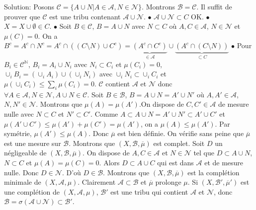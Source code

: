 \documentclass{report}
\begin{document}
Solution: Posons $\mathcal C = \{A\cup N| A\in \mathcal A, N\in \mathcal N\}$.  Montrons $\mathcal B = \mathcal C$.\newline
\fbox{$\subset$} Il suffit de prouver que $\mathcal C$ est une tribu contenant $\mathcal A \cup \mathcal N$. \newline
$\bullet$ $\mathcal A \cup \mathcal N \subset C$ \quad OK.\newline
$\bullet$ $X = X\cup \emptyset \in C$.\newline
$\bullet$ Soit $B\in \mathcal C$, $B= A\cup N$ avec $N\subset C$ où $A,C\in \mathcal A$, $N\in \mathcal N$ et $\mu(C)=0$.\newline
On a $B^c = A^c \cap N^c = A^c \cap ((C\setminus N) \cup C^c) = \underbrace{(A^c \cap C^c)}_{\in \mathcal A}\cup \underbrace{(A^c \cap (C\setminus N))}_{\subset C}$\newline
$\bullet$ Pour $B_i\in \mathcal C^{\mathbb N}$, $B_i = A_i \cup N_i$ avec $N_i\subset C_i$ et $\mu(C_i)=0$, \newline
$\cup_i B_i = (\cup_i A_i) \cup (\cup_i N_i) $ avec $\cup_i N_i \subset \cup_i C_i$ et $\mu(\cup_i C_i)\leq \sum_i \mu(C_i) = 0$.\newline
\fbox{$\supset$} $\mathcal C$ contient $\mathcal A$ et $\mathcal N$ donc $\forall A\in \mathcal A, N\in \mathcal N, A\cup N \in \mathcal C.$ \newline \newline
Soit $B\in\mathcal B$, $B=A\cup N=A' \cup N'$ où $A,A'\in \mathcal A$, $N,N'\in\mathcal N$. Montrons que $\mu(A)=\mu(A')$.\newline On dispose de $C,C'\in \mathcal A$ de mesure nulle avec $N\subset C$ et $N'\subset C'$. Comme $A\subset A\cup N = A'\cup N'\subset A'\cup C'$ et $\mu(A'\cup C')\leq \mu(A')+\mu(C') = \mu(A')$, on a $\mu(A)\leq \mu(A')$. Par symétrie, $\mu(A')\leq \mu(A)$. Donc $\overline \mu$ est bien définie.\newline \newline
On vérifie sans peine que $\overline \mu$ est une mesure sur $\mathcal B$.\newline
Montrons que $(X,\mathcal B, \overline \mu)$ est complet. Soit $D$ un négligeable de $(X,\mathcal B, \overline \mu)$. On dispose de $A, C\in \mathcal A$ et $N\in \mathcal N$ tel que $D\subset A\cup N$, $N\subset C$ et $\mu(A)=\mu(C)=0$. Alors $D\subset A\cup C$ qui est dans $\mathcal A$ et de mesure nulle. Donc $D\in \mathcal N$. D'où $D\in \mathcal B$.\newline \newline
Montrons que $(X,\mathcal B, \overline \mu)$ est la complétion minimale de $(X,\mathcal A,\mu) $. Clairement $\mathcal A\subset \mathcal B$ et $\overline \mu$ prolonge $\mu$. Si $(X,\mathcal B', \overline \mu')$ est une complétion de $(X,\mathcal A,\mu) $, $\mathcal B'$ est une tribu qui contient $\mathcal A$ et $\mathcal N$, donc $\mathcal B = \sigma(\mathcal A\cup \mathcal N)\subset \mathcal B'$.
\end{document}
